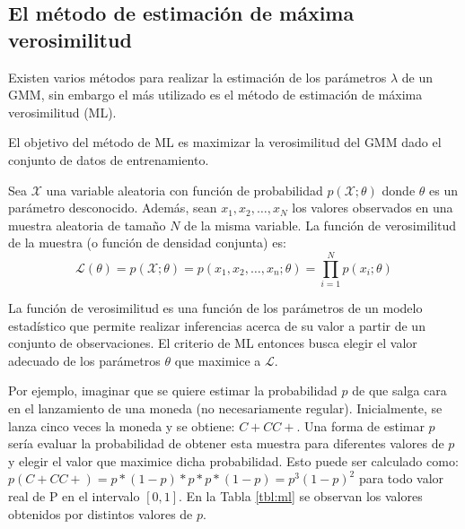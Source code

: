 \documentclass[a4paper]{article}
\begin{document}
\subsection{El método de estimación de máxima verosimilitud} %
\label{sub:el_criterio_de_máxima_verosimilitud}
Existen varios métodos para realizar la estimación de los parámetros $\lambda$ de un GMM, sin embargo el más utilizado es el método de estimación de máxima verosimilitud (ML).

El objetivo del método de ML es maximizar la verosimilitud del GMM dado el conjunto de datos de entrenamiento.

Sea $\mathcal{X}$ una variable aleatoria con función de probabilidad $p(\mathcal{X};\theta)$ donde $\theta$ es un parámetro desconocido.
Además, sean $x_1,x_2,\ldots ,x_N$ los valores observados en una muestra aleatoria de tamaño $N$ de la misma variable.
La función de verosimilitud de la muestra (o función de densidad conjunta) es:
\begin{equation}
\mathcal{L}(\theta) = p(\mathcal{X};\theta) = p(x_1,x_2,\ldots,x_n ; \theta) = \prod_{i=1}^N p(x_i ; \theta)
\end{equation}

La función de verosimilitud es una función de los parámetros de un modelo estadístico que permite realizar inferencias acerca de su valor a partir de un conjunto de observaciones.
El criterio de ML entonces busca elegir el valor adecuado de los parámetros $\theta$ que maximice a $\mathcal{L}$.

Por ejemplo, imaginar que se quiere estimar la probabilidad $p$ de que salga cara en el lanzamiento de una moneda (no necesariamente regular).
Inicialmente, se lanza cinco veces la moneda y se obtiene: $C + C C +$.
Una forma de estimar $p$ sería evaluar la probabilidad de obtener esta muestra para diferentes valores de $p$ y elegir el valor que maximice dicha probabilidad.
Esto puede ser calculado como: $p(C + C C +) = p * (1 - p) * p * p * (1 - p) = p^3 (1 - p)^2$ para todo valor real de P en el intervalo $[0,1]$.
En la Tabla \ref{tbl:ml} se observan los valores obtenidos por distintos valores de $p$.
\end{document}
